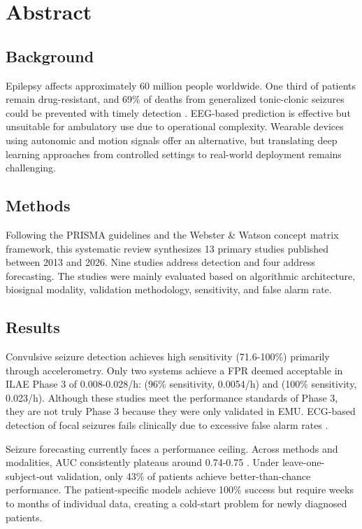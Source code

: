 \section*{Abstract}


\subsection*{Background}
Epilepsy affects approximately 60 million people worldwide. One third of patients remain drug-resistant, and 69\% of deaths from generalized tonic-clonic seizures could be prevented with timely detection \parencite{sveinssonClinicalRiskFactors2020}. EEG-based prediction is effective but unsuitable for ambulatory use due to operational complexity. Wearable devices using autonomic and motion signals offer an alternative, but translating deep learning approaches from controlled settings to real-world deployment remains challenging.

\subsection*{Methods}
Following the PRISMA guidelines and the Webster \& Watson concept matrix framework, this systematic review synthesizes 13 primary studies published between 2013 and 2026. Nine studies address detection and four address forecasting. The studies were mainly evaluated based on algorithmic architecture, biosignal modality, validation methodology, sensitivity, and false alarm rate.

\subsection*{Results}
Convulsive seizure detection achieves high sensitivity (71.6-100\%) primarily through accelerometry. Only two systems achieve a FPR deemed acceptable in ILAE Phase 3 of 0.008-0.028/h: \textcite{spahrDeepLearningbasedDetection2025} (96\% sensitivity, 0.0054/h) and \textcite{fineDetectionKeyAutomated2025} (100\% sensitivity, 0.023/h). Although these studies meet the performance standards of Phase 3, they are not truly Phase 3 because they were only validated in EMU. ECG-based detection of focal seizures fails clinically due to excessive false alarm rates \parencite{reintjesECGBasedDetectionEpileptic2025}.

Seizure forecasting currently faces a performance ceiling. Across methods and modalities, AUC consistently plateaus around 0.74-0.75 \parencite{meiselMachineLearningWristband2020,vielufSeizureMonitoringCombined2025}. Under leave-one-subject-out validation, only 43\% of patients achieve better-than-chance performance. The patient-specific models achieve 100\% success but require weeks to months of individual data, creating a cold-start problem for newly diagnosed patients.

